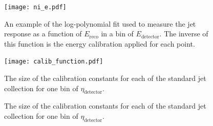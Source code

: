 


\begin{figure}
\centering
\texttt{[image: ni\_e.pdf]}
\label{fig:jet-reconstruction:ni-e}
\caption{An example of the log-polynomial fit used to measure the jet response as a function of $E_\mathrm{reco}$ in a bin of $E_\mathrm{detector}$. The inverse of this function is the energy calibration applied for each point.}
\end{figure}



\begin{figure}
\centering
\texttt{[image: calib\_function.pdf]}
\label{fig:jet-reconstruction:calib-function}
\caption{The size of the calibration constants for each of the standard jet collection for one bin of $\eta_\mathrm{detector}$.}
\end{figure}



\begin{figure}
\centering
{}
\label{fig:jet-reconstruction:total_jes}
\caption{The size of the calibration constants for each of the standard jet collection for one bin of $\eta_\mathrm{detector}$.}
\end{figure}

